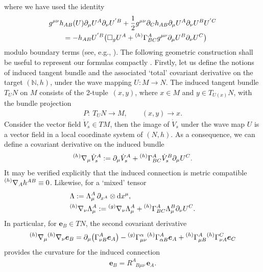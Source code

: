 \documentclass[pdftex]{sigma}
\def\ptl{\partial}%
\def\mbo#1{\boldsymbol{#1}}%
\def\grad{{\nabla}}%
\newcommand{\leftexp}[2]{{\vphantom{#2}}^{#1}{#2}}
\def\halb{\frac{1}{2}}%
\def \a{\alpha}
\renewcommand{\a}{\alpha}
\numberwithin{equation}{section}
\begin{document}
where we have used the identity
\begin{align} \label{christof-intro}
& g^{\mu \nu} h_{AB}(U) \ptl_\mu U^A \ptl_\nu U^{'B} + \halb g^{\mu \nu}\ptl_C h_{AB} \ptl_\mu U^A \ptl_\nu U^B U^{'C} \notag\\
&\qquad{} = - h_{AB} U^{'B} \bigl(\square_g U^A + \leftexp{(h)}{\Gamma}^A_{BC} g^{\mu \nu} \ptl_\mu U^B \ptl_\nu U^C\bigr)
\end{align}
modulo boundary terms (see, e.g., \cite[pp.~19--20]{diss_13}). The following geometric construction shall be useful to represent our formulas compactly \cite{Misn_78}. Firstly, let us define the notions of induced tangent bundle and the associated `total' covariant derivative on the target $(\mathbb{N}, h)$, under the wave mapping $U \colon M \to N$. The induced tangent bundle $T_U N$ on $M$ consists of the 2-tuple~$(x, y)$, where $x \in M$ and $y \in T_{U(x)} N$, with the bundle projection
\begin{align*}
P \colon\ T_U N \to M, \qquad
(x, y) \to x.
\end{align*}
Consider the vector field $\dot{V}_s \in TM$, then the image of $\dot{V}_s$ under the wave map $U$ is a vector field \smash{$\dot{V}_s^A = \ptl_s U^A$} in a local coordinate system of $(N, h)$. As a consequence, we can define a covariant derivative on the induced bundle
\begin{align*}
\leftexp{(h)}{\grad}_\mu \dot{V}^A_s := \ptl_\mu \dot{V}_s^A + \leftexp{(h)}{\Gamma}^A_{BC} \dot{V}_s^B \ptl_\mu U^C.
\end{align*}
It may be verified explicitly that the induced connection is metric compatible $\leftexp{(h)}{\grad}_A h^{AB} \equiv 0$. Likewise, for a `mixed' tensor
\begin{align*}
&\Lambda := \Lambda^A_\mu \, \ptl_{x^A} \otimes {\rm d}x^\mu,
\\
&\leftexp{(h)}{\grad}_\nu \Lambda_\mu^A := \leftexp{(g)}{\grad}_\nu \Lambda_\mu^A + \leftexp{(h)}{\Gamma}^A_{BC} \Lambda^B_\mu \ptl_\nu U^C.
\end{align*}
In particular, for $\mbo{e}_B \in TN$, the second covariant derivative
\begin{align*}
\leftexp{(h)}{\grad}_ \mu \leftexp{(h)}{\grad}_\nu \mbo{e}_B = \ptl_\mu \bigl(\Gamma^A_{\nu B} \mbo{e}_A\bigr) - \leftexp{(g)}{\Gamma}^\a_{\mu \nu} \leftexp{(h)}{\Gamma}^A_{\a B} \mbo{e}_A + \leftexp{(h)}{\Gamma}^A_{\mu B} \leftexp{(h)}{\Gamma}^C_{\nu A} \mbo{e}_C
\end{align*}
provides the curvature for the induced connection
\begin{align*}
[ \grad_\mu, \grad_\nu ] \mbo{e}_B = R^A_{\,\,\,\, B \mu \nu} \, \mbo{e}_A.
\end{align*}
\end{document}
